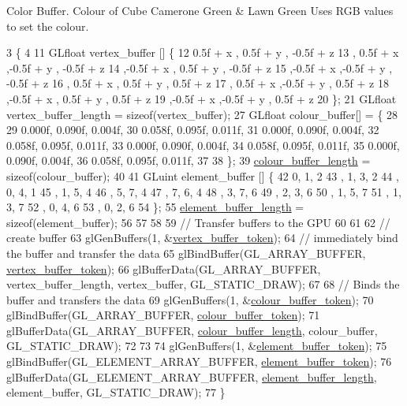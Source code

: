 Color Buffer. Colour of Cube Camerone Green \& Lawn Green Uses R\+G\+B values to set the colour.
\begin{DoxyCode}
3                                                         \{
4 
11   GLfloat vertex\_buffer [] \{
12       0.5f + x  , 0.5f + y  , -0.5f + z
13     , 0.5f + x  ,-0.5f + y  , -0.5f + z
14     ,-0.5f + x  , 0.5f + y  , -0.5f + z
15     ,-0.5f + x  ,-0.5f + y  , -0.5f + z
16     , 0.5f + x  , 0.5f + y  ,  0.5f + z
17     , 0.5f + x  ,-0.5f + y  ,  0.5f + z
18     ,-0.5f + x  , 0.5f + y  ,  0.5f + z
19     ,-0.5f + x  ,-0.5f + y  ,  0.5f + z
20   \};
21   GLfloat vertex\_buffer\_length = \textcolor{keyword}{sizeof}(vertex\_buffer);
27   GLfloat colour\_buffer[] = \{
28 
29      0.000f, 0.090f, 0.004f, 
30      0.058f, 0.095f, 0.011f,
31      0.000f, 0.090f, 0.004f,
32      0.058f, 0.095f, 0.011f,
33      0.000f, 0.090f, 0.004f,
34      0.058f, 0.095f, 0.011f,
35      0.000f, 0.090f, 0.004f,
36      0.058f, 0.095f, 0.011f,
37 
38   \};
39  \hyperlink{classLeavesAsset_aa98b368598e1181d85d9797e07506ecb}{colour\_buffer\_length} = \textcolor{keyword}{sizeof}(colour\_buffer);
40   
41   GLuint element\_buffer []  \{
42       0, 1, 2   
43     , 1, 3, 2
44     , 0, 4, 1   
45     , 1, 5, 4   
46     , 5, 7, 4   
47     , 7, 6, 4   
48     , 3, 7, 6   
49     , 2, 3, 6   
50     , 1, 5, 7   
51     , 1, 3, 7   
52     , 0, 4, 6   
53     , 0, 2, 6   
54   \};
55   \hyperlink{classLeavesAsset_a6a09aacce21f8ce5a6b80da9f40bc9d5}{element\_buffer\_length} = \textcolor{keyword}{sizeof}(element\_buffer);
56 
57 
58 
59   \textcolor{comment}{// Transfer buffers to the GPU}
60 
61 
62   \textcolor{comment}{// create buffer}
63   glGenBuffers(1, &\hyperlink{classLeavesAsset_a360df8eb2239e2f4ed069522d0de7629}{vertex\_buffer\_token});
64   \textcolor{comment}{// immediately bind the buffer and transfer the data}
65   glBindBuffer(GL\_ARRAY\_BUFFER, \hyperlink{classLeavesAsset_a360df8eb2239e2f4ed069522d0de7629}{vertex\_buffer\_token});
66   glBufferData(GL\_ARRAY\_BUFFER, vertex\_buffer\_length, vertex\_buffer, GL\_STATIC\_DRAW);
67 
68   \textcolor{comment}{// Binds the buffer and transfers the data}
69   glGenBuffers(1, &\hyperlink{classLeavesAsset_a7e586bea0f5a80b9a262f11e31a5faac}{colour\_buffer\_token});
70   glBindBuffer(GL\_ARRAY\_BUFFER, \hyperlink{classLeavesAsset_a7e586bea0f5a80b9a262f11e31a5faac}{colour\_buffer\_token});
71   glBufferData(GL\_ARRAY\_BUFFER, \hyperlink{classLeavesAsset_aa98b368598e1181d85d9797e07506ecb}{colour\_buffer\_length}, colour\_buffer, GL\_STATIC\_DRAW);
72 
73 
74   glGenBuffers(1, &\hyperlink{classLeavesAsset_a2a47b7b2ad8a35f4499a12db80073efb}{element\_buffer\_token});
75   glBindBuffer(GL\_ELEMENT\_ARRAY\_BUFFER, \hyperlink{classLeavesAsset_a2a47b7b2ad8a35f4499a12db80073efb}{element\_buffer\_token});
76   glBufferData(GL\_ELEMENT\_ARRAY\_BUFFER, \hyperlink{classLeavesAsset_a6a09aacce21f8ce5a6b80da9f40bc9d5}{element\_buffer\_length}, element\_buffer, 
      GL\_STATIC\_DRAW);
77 \}
\end{DoxyCode}
\hypertarget{classLeavesAsset_ae98d43a307f4c75cc8a661f0b36a213a}{}
